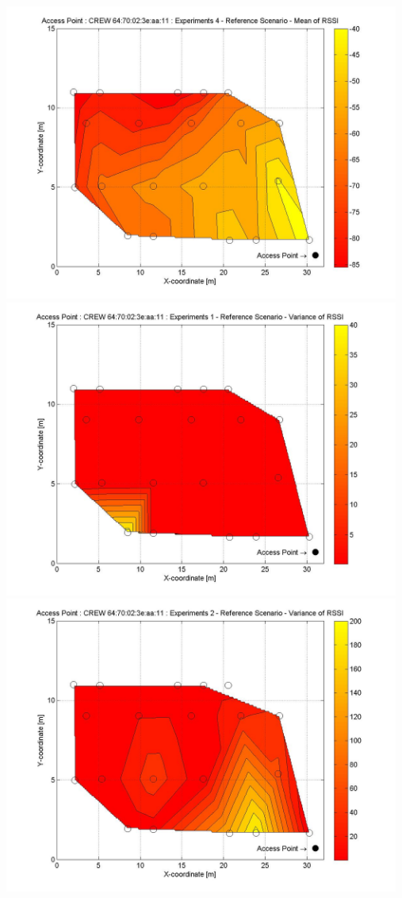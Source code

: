\documentclass[11pt,a4paper,headinclude,footinclude,chapterprefix=on]{scrreprt}
\begin{document}
\begin{longtable}
	\includegraphics[width=13cm]{../../Source/plot/CREW_11/11_Ref_Ex_4_Mean.jpg} \\
	\includegraphics[width=13cm]{../../Source/plot/CREW_11/11_Ref_Ex_1_Variance.jpg} \\
	\includegraphics[width=13cm]{../../Source/plot/CREW_11/11_Ref_Ex_2_Variance.jpg} \\

\end{longtable}
\end{document}
